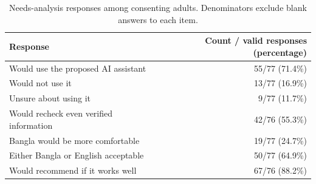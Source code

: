 \begin{table}[htbp]\centering\small
\caption{Needs-analysis responses among consenting adults. Denominators exclude blank answers to each item.}\label{tab:needs-survey}
\begin{tabularx}{\linewidth}{Xr}\toprule
Response & Count / valid responses (percentage)\\\midrule
Would use the proposed AI assistant & 55/77 (71.4\%)\\
Would not use it & 13/77 (16.9\%)\\
Unsure about using it & 9/77 (11.7\%)\\
Would recheck even verified information & 42/76 (55.3\%)\\
Bangla would be more comfortable & 19/77 (24.7\%)\\
Either Bangla or English acceptable & 50/77 (64.9\%)\\
Would recommend if it works well & 67/76 (88.2\%)\\
\bottomrule\end{tabularx}\end{table}
